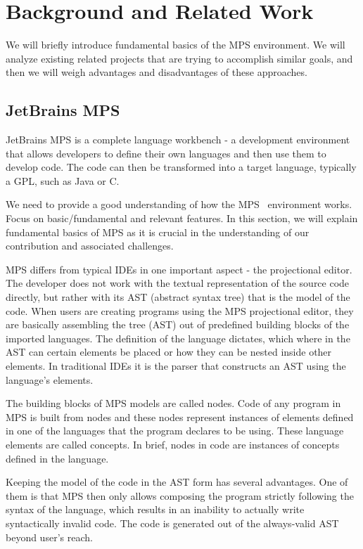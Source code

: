 \section{Background and Related Work}
\label{sect:BACKGRELWORK}

We will briefly introduce fundamental basics of the MPS environment.
We will analyze existing related projects that are trying to accomplish similar goals, and then we will weigh advantages and disadvantages of these approaches.

\subsection{JetBrains MPS}
\label{sect:MPS}

 JetBrains MPS is a complete language workbench - a development environment that allows developers to define their own languages and then use them to develop code. The code can then be transformed into a target language, typically a GPL, such as Java or C.

We need to provide a good understanding of how the MPS~\cite{ref:MPS} environment works.
Focus on basic/fundamental and relevant features. In this section, we will explain fundamental basics of MPS as it is crucial in the understanding of our contribution and associated challenges.

 MPS differs from typical IDEs in one important aspect - the projectional editor. The developer does not work with the textual representation of the source code directly, but rather with its AST (abstract syntax tree) that is the model of the code. When users are creating programs using the MPS projectional editor, they are basically assembling the tree (AST) out of predefined building blocks of the imported languages. The definition of the language dictates, which where in the AST can certain elements be placed or how they can be nested inside other elements. In traditional IDEs it is the parser that constructs an AST using the language's elements.

 The building blocks of MPS models are called nodes. Code of any program in MPS is built from nodes and these nodes represent instances of elements defined in one of the languages that the program declares to be using. These language elements are called concepts. In brief, nodes in code are instances of concepts defined in the language.

Keeping the model of the code in the AST form has several advantages.
One of them is that MPS then only allows composing the program strictly following the syntax of the language, which results in an inability to actually write syntactically invalid code.
The code is generated out of the always-valid AST beyond user's reach.


